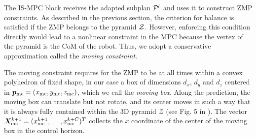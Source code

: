The IS-MPC block receives the adapted subplan ${\cal P}^l$ and uses it to construct ZMP constraints. As described in the previous section, the criterion for balance is satisfied if the ZMP belongs to the pyramid $\cal Z$. However, enforcing this condition directly would lead to a nonlinear constraint in the MPC because the vertex of the pyramid is the CoM of the robot. Thus, we adopt a conservative approximation called the {\em moving constraint}.

The moving constraint requires for the ZMP to be at all times within a convex polyhedron of fixed shape, in our case a box of dimensions $d_x$, $d_y$ and $d_z$ centered in ${\bm{p}}_{\rm mc}=(x_{\rm mc}, y_{\rm mc}, z_{\rm mc})$, which we call the {\em moving box}. Along the prediction, the moving box can translate but not rotate, and its center moves in such a way that it is always fully contained within the 3D pyramid $\mathcal{Z}$ (see Fig. 5 in \cite{ZaScLaOr:18}). The vector $\bm{X}_{\rm mc}^{k+1} = (x_{\rm mc}^{k+1}, \dots, x_{\rm mc}^{k+C})^T$ collects the $x$ coordinate of the center of the moving box in the control horizon.


